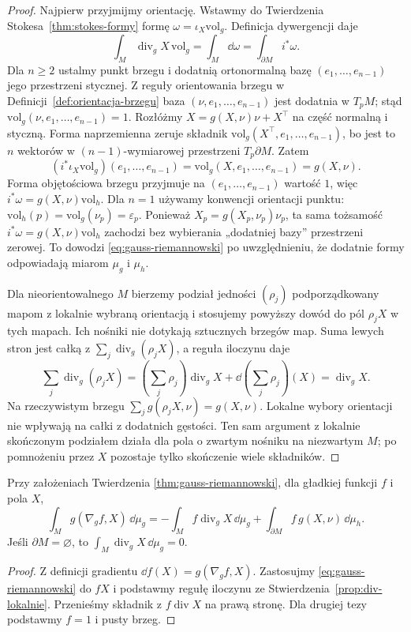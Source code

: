 \begin{proof}
Najpierw przyjmijmy orientację. Wstawmy
do Twierdzenia Stokesa~\ref{thm:stokes-formy}
formę $\omega=\iota_X\mathrm{vol}_g$.
Definicja dywergencji daje
\[
 \int_M\operatorname{div}_gX\,\mathrm{vol}_g
 =\int_M\dd\omega
 =\int_{\partial M}i^*\omega.
\]
Dla $n\geq2$ ustalmy punkt brzegu i dodatnią ortonormalną
bazę $(e_1,\ldots,e_{n-1})$ jego przestrzeni
stycznej. Z reguły orientowania brzegu
w Definicji~\ref{def:orientacja-brzegu}
baza $(\nu,e_1,\ldots,e_{n-1})$ jest
dodatnia w $T_pM$; stąd
$\mathrm{vol}_g(\nu,e_1,\ldots,e_{n-1})=1$.
Rozłóżmy $X=g(X,\nu)\nu+X^\top$ na część
normalną i styczną. Forma naprzemienna
zeruje składnik
$\mathrm{vol}_g(X^\top,e_1,\ldots,e_{n-1})$,
bo jest to $n$ wektorów w $(n-1)$-wymiarowej
przestrzeni $T_p\partial M$. Zatem
\[
 (i^*\iota_X\mathrm{vol}_g)
      (e_1,\ldots,e_{n-1})
 =\mathrm{vol}_g(X,e_1,\ldots,e_{n-1})
 =g(X,\nu).
\]
Forma objętościowa brzegu przyjmuje
na $(e_1,\ldots,e_{n-1})$ wartość $1$,
więc $i^*\omega=g(X,\nu)\mathrm{vol}_h$.
Dla $n=1$ używamy konwencji orientacji punktu:
$\mathrm{vol}_h(p)=\mathrm{vol}_g(\nu_p)=\varepsilon_p$.
Ponieważ $X_p=g(X_p,\nu_p)\nu_p$, ta sama tożsamość
$i^*\omega=g(X,\nu)\mathrm{vol}_h$ zachodzi bez wybierania
„dodatniej bazy” przestrzeni zerowej.
To dowodzi \eqref{eq:gauss-riemannowski}
po uwzględnieniu, że dodatnie formy
odpowiadają miarom $\mu_g$ i $\mu_h$.

Dla nieorientowalnego $M$ bierzemy podział
jedności $(\rho_j)$ podporządkowany mapom
z lokalnie wybraną orientacją i stosujemy
powyższy dowód do pól $\rho_jX$ w tych mapach.
Ich nośniki nie dotykają sztucznych brzegów map.
Suma lewych stron jest całką z
$\sum_j\operatorname{div}_g(\rho_jX)$,
a reguła iloczynu daje
\[
 \sum_j\operatorname{div}_g(\rho_jX)
 =\left(\sum_j\rho_j\right)\operatorname{div}_gX
  +\dd\!\left(\sum_j\rho_j\right)(X)
 =\operatorname{div}_gX.
\]
Na rzeczywistym brzegu
$\sum_jg(\rho_jX,\nu)=g(X,\nu)$.
Lokalne wybory orientacji nie wpływają
na całki z dodatnich gęstości.
Ten sam argument z lokalnie skończonym
podziałem działa dla pola o zwartym nośniku
na niezwartym $M$; po pomnożeniu przez $X$
pozostaje tylko skończenie wiele składników.
\end{proof}

\begin{wniosek}
\label{cor:riemann-calkowanie-przez-czesci}
Przy założeniach Twierdzenia
\ref{thm:gauss-riemannowski}, dla gładkiej
funkcji $f$ i pola $X$,
\[
 \int_M g(\nabla_gf,X)\,\dd\mu_g
 =-\int_M f\operatorname{div}_gX\,\dd\mu_g
   +\int_{\partial M}f\,g(X,\nu)\,\dd\mu_h.
\]
Jeśli $\partial M=\varnothing$, to
$\int_M\operatorname{div}_gX\,\dd\mu_g=0$.
\end{wniosek}
\begin{proof}
Z definicji gradientu $\dd f(X)=g(\nabla_gf,X)$.
Zastosujmy \eqref{eq:gauss-riemannowski}
do $fX$ i podstawmy regułę iloczynu
ze Stwierdzenia~\ref{prop:div-lokalnie}.
Przenieśmy składnik z $f\operatorname{div}X$
na prawą stronę. Dla drugiej tezy podstawmy
$f=1$ i pusty brzeg.
\end{proof}

